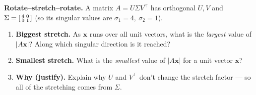\documentclass[10pt]{article}
\newcommand{\xx}{\mathbf{x}}
\newcommand{\T}{^{\top}}
\begin{document}
\begin{tcolorbox}[colback=white, colframe=black!40, title=\textbf{Tier E --- Extension},
    fonttitle=\bfseries, arc=1.5mm, left=3mm, right=3mm, top=2mm, bottom=2mm, breakable]
\textbf{Rotate--stretch--rotate.} A matrix $A=U\Sigma V\T$ has orthogonal $U,V$ and
$\Sigma=\begin{bsmallmatrix} 4 & 0\\ 0 & 1 \end{bsmallmatrix}$ (so its singular values are $\sigma_1=4,\ \sigma_2=1$).
\begin{enumerate}[leftmargin=1.7em, itemsep=9pt]
  \item \textbf{Biggest stretch.} As $\xx$ runs over all unit vectors, what is the \emph{largest} value of $|A\xx|$? Along which singular direction is it reached? \writeline
  \item \textbf{Smallest stretch.} What is the \emph{smallest} value of $|A\xx|$ for a unit vector $\xx$? \writeline
  \item \textbf{Why (justify).} Explain why $U$ and $V\T$ don't change the stretch factor --- so all of the stretching comes from $\Sigma$. 
\end{enumerate}
\end{tcolorbox}
\end{document}
